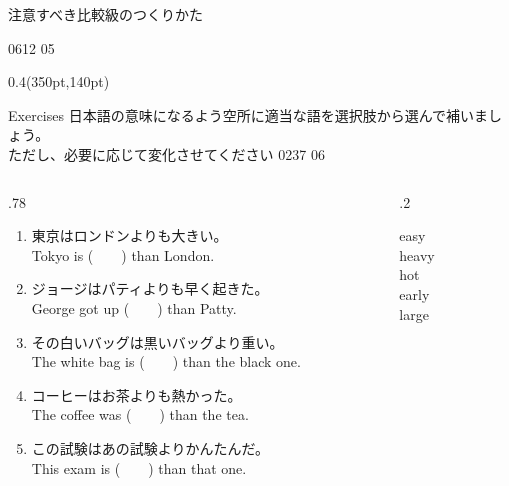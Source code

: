 \documentclass[aspectratio=169,xcolor={dvipsnames,table}]{beamer}
\begin{document}
\begin{frame}[plain,label=table2]{注意すべき比較級のつくりかた}
\vfill

%
\hfill{\tiny 0612}\,{\tiny{}\,05}

\begin{textblock*}{0.4\linewidth}(350pt,140pt)
\end{textblock*}
\end{frame}
\begin{frame}[plain,t]{Exercises}
 日本語の意味になるよう空所に適当な語を選択肢から選んで補いましょう。\\
ただし、必要に応じて変化させてください%
\hfill{\tiny 0237}\,{\tiny{}\,06}

\vspace{-10pt}

\begin{columns}[t]
 \begin{column}{.78\textwidth}
   \begin{enumerate}
  \item 東京はロンドンよりも大きい。\\
	Tokyo is (~~~~) than London. 
    \item ジョージはパティよりも早く起きた。\\
	George got up (~~~~) than Patty. 
    \item その白いバッグは黒いバッグより重い。\\
	The white bag is (~~~~) than the black one. 
    \item コーヒーはお茶よりも熱かった。\\
	The coffee was (~~~~) than the tea. 
    \item この試験はあの試験よりかんたんだ。\\
	This exam  is (~~~~) than that one. 
 \end{enumerate}
 \end{column}
\begin{column}{.2\textwidth}
 \begin{tcolorbox}
  easy\\
  heavy\\
  hot\\
  early\\
  large
 \end{tcolorbox}
\end{column}
\end{columns}
\end{frame}
\end{document}
